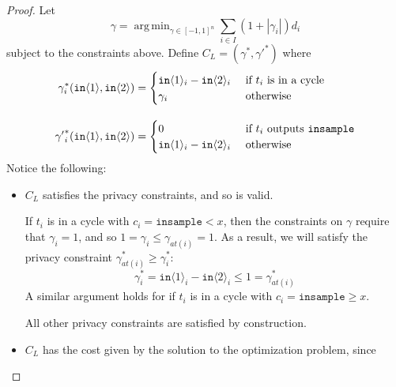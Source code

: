 \documentclass[12pt]{article}
\newcommand{\gguard}[1][x]{\texttt{insample}\geq#1}
\newcommand{\lguard}[1][x]{\texttt{insample} < #1}
\newcommand{\brangle}[1]{\langle#1 \rangle}
\DeclareMathOperator*{\argmin}{arg\,min}
\theoremstyle{definition}
\begin{document}
\begin{proof}
    Let 
    \[\gamma = \argmin_{\gamma \in [-1, 1]^n} \sum_{i \in I} \left(1 + |\gamma_i| \right) d_i\]
    subject to the constraints above. Define $C_L = (\gamma^*, {\gamma'}^*)$ where
    \begin{align*}
        \gamma_i^*(\texttt{in}\brangle{1}, \texttt{in}\brangle{2}) &= \begin{cases}
            \texttt{in}\brangle{1}_i - \texttt{in}\brangle{2}_i &\text{ if } t_i \text{ is in a cycle} \\
            \gamma_i &\text{ otherwise}
        \end{cases} \\[1em]
        {\gamma'}_i^*(\texttt{in}\brangle{1}, \texttt{in}\brangle{2}) &= \begin{cases}
            0 &\text{ if } t_i \text{ outputs \texttt{insample}} \\
            \texttt{in}\brangle{1}_i - \texttt{in}\brangle{2}_i &\text{ otherwise}
        \end{cases}
    \end{align*}
    Notice the following: 

    \begin{itemize}
        \item $C_L$ satisfies the privacy constraints, and so is valid.
        
        If $t_i$ is in a cycle with $c_i = \lguard$, then the constraints on $\gamma$ require that $\gamma_i = 1$, and so $1 = \gamma_i \leq \gamma_{at(i)} = 1$. As a result, we will satisfy the privacy constraint $\gamma_{at(i)}^* \geq \gamma_i^*$: 
        \[\gamma_i^* = \texttt{in}\brangle{1}_i - \texttt{in}\brangle{2}_i \leq 1 = \gamma_{at(i)}^*\]
        A similar argument holds for if $t_i$ is in a cycle with $c_i = \gguard$.

        All other privacy constraints are satisfied by construction.

        \item $C_L$ has the cost given by the solution to the optimization problem, since
        

\end{itemize}
\end{proof}
\end{document}
